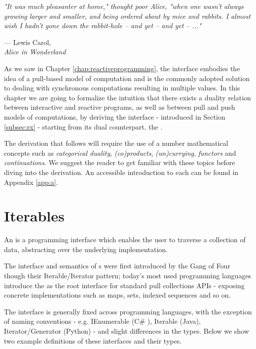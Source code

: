 \let\textcircled=\pgftextcircled
{}

\epigraph{\hspace{4ex}\textit{"It was much pleasanter at home," thought poor Alice, "when one wasn't always growing larger and smaller, and being ordered about by mice and rabbits. I almost wish I hadn't gone down the rabbit-hole -- and yet -- and yet -- ..."}}{--- Lewis Carol,\\ \textit{Alice in Wonderland}}

As we saw in Chapter \ref{chap:reactiveprogramming}, the  interface embodies the idea of a pull-based model of computation and is the commonly adopted solution to dealing with synchronous computations resulting in multiple values. In this chapter we are going to formalize the intuition that there exists a duality relation between interactive and reactive programs\citep{meijer2010observable}, as well as between pull and push models of computations, by deriving the  interface - introduced in Section \ref{subsec:rx} - starting from its dual counterpart, the .

The derivation that follows will require the use of a number mathematical concepts such as \textit{categorical duality}, \textit{(co)products}, \textit{(un)currying}, \textit{functors} and \textit{continuations}. We suggest the reader to get familiar with these topics before diving into the derivation. An accessible introduction to each can be found in Appendix \ref{app:a}.

\section{Iterables}
\label{sec:iterables}

An  is a programming interface which enables the user to traverse a collection of data, abstracting over the underlying implementation\cite{gamma1995design}.

The interface and semantics of s were first introduced by the Gang of Four though their Iterable/Iterator pattern\cite{gamma1995design}; today's most used programming languages introduce the  as the root interface for standard pull collections APIs - exposing concrete implementations such as maps, sets, indexed sequences and so on. 

The  interface is generally fixed across programming languages, with the exception of naming conventions - e.g. IEnumerable (C\# ), Iterable (Java), Iterator/Generator (Python) - and slight differences in the types. Below we show two example definitions of these interfaces and their types.

